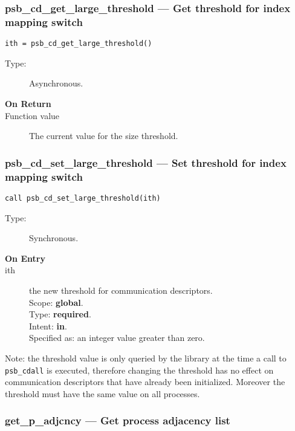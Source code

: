 \subsubsection{psb\_cd\_get\_large\_threshold --- Get threshold for
  index mapping switch}

\begin{verbatim}
ith = psb_cd_get_large_threshold()
\end{verbatim}

\begin{description}
\item[Type:] Asynchronous.
\item[\bf On Return]
\item[Function value] The current value for the size threshold. 

\end{description}



\subsubsection{psb\_cd\_set\_large\_threshold --- Set threshold for
  index mapping switch}

\begin{verbatim}
call psb_cd_set_large_threshold(ith)
\end{verbatim}

\begin{description}
\item[Type:] Synchronous.
\item[\bf On Entry]
\item[ith] the new threshold for communication descriptors.\\
Scope: {\bf global}.\\
Type: {\bf required}.\\
Intent: {\bf in}.\\
Specified as: an integer value greater than zero.
\end{description}
Note: the threshold value is only queried by the library at the time a
call to \verb|psb_cdall| is executed, therefore changing the threshold
has no effect on communication descriptors that have already been
initialized. Moreover the threshold must have the same value on all
processes. 


\subsubsection{get\_p\_adjcncy --- Get process adjacency list}

